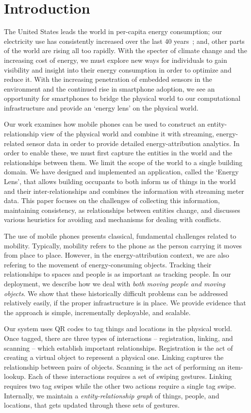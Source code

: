 \section{Introduction}
The United States leads the world in per-capita energy consumption; 
our electricity use has consistently increased over the last 40 years~\cite{oecd2011}; and, other parts of the world are rising all 
too rapidly.  With the specter of climate change and the increasing cost of energy, we must explore new
ways for individuals to gain visibility and insight into their energy consumption in order to optimize and reduce it. 
With the increasing penetration of embedded sensors in the environment and
the continued rise in smartphone adoption, we see an opportunity for smartphones to bridge the physical world
to our computational infrastructure and provide an `energy lens' on the physical world.  

Our work examines how mobile phones can be used to construct an entity-relationship view of the physical world and combine it with 
streaming, energy-related 
sensor data in order to provide detailed energy-attribution analytics.  In order to enable these, we must first capture the entities
in the world and the relationships between them.  We limit the scope of the world to a single building domain.  We have 
designed and implemented an application, called the `Energy Lens', that allows building occupants to both inform us 
of things in the world and their inter-relationships and combines the information with streaming meter data.  This paper focuses
on the challenges of collecting this information, maintaining consistency, as relationships between entities change, and 
discusses various heuristics for avoiding and mechanisms for dealing with conflicts.

The use of mobile phones presents classical, fundamental challenges related to mobility.  Typically, mobility
refers to the phone as the person carrying it moves from place to place.  However, in the energy-attribution
context, we are also refering to the movement of energy-consuming objects.  Tracking their relationships to spaces 
and people is as important as tracking people.  In our deployment, we describe how we deal with \emph{both moving people and 
moving objects}.  We show that these historically difficult problems can be addressed relatively easily, if the proper infrastructure is 
in place.  We provide evidence that the approach is simple, incrementally deployable, and scalable.

Our system uses QR codes to tag things and locations in the physical world.  Once tagged, there are three types of interactions -- 
registration, linking, and scanning -- which establish important relationships.  Registration is the act of creating a virtual object 
to represent a physical one.  Linking captures the relationship between pairs of objects.  Scanning is the act of performing an item-lookup.
Each of these interactions requires a set of swiping gestures.  Linking requires two tag swipes while the other two actions
require a single tag swipe.  Internally, we maintain a \emph{entity-relationship graph} of things, people, and locations, that gets
updated through these sets of gestures.

